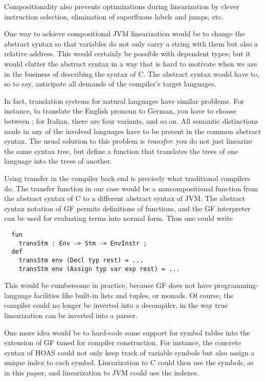 \documentclass[12pt]{article}
\newcommand{\empha}[1]{{\em #1}}
\begin{document}
Compositionality also prevents optimizations during linearization
by clever instruction selection, elimination of superfluous
labels and jumps, etc.

One way to achieve compositional JVM linearization would be
to change the abstract syntax
so that variables do not only carry a string with them but
also a relative address. This would certainly be possible
with dependent types; but it would clutter the abstract
syntax in a way that is hard to motivate when we are in
the business of describing the syntax of C. The abstract syntax would
have to, so to say, anticipate all demands of the compiler's
target languages. 

In fact, translation systems for natural
languages have similar problems. For instance, to translate
the English pronoun  to German, you have to choose
between ; for Italian, there are four
variants, and so on. All semantic distinctions
made in any of the involved languages have to be present
in the common abstract syntax. The usual solution to 
this problem is \empha{transfer}: you do not just linearize
the same syntax tree, but define a function that translates
the trees of one language into the trees of another.

Using transfer in the compiler
back end is precisely what traditional compilers do.
The transfer function in our case would be a noncompositional
function from the abstract syntax of C to a different abstract
syntax of JVM. The abstract syntax notation of GF permits
definitions of functions, and the GF interpreter can be used
for evaluating terms into normal form. Thus one could write
\begin{verbatim}
  fun 
    transStm : Env -> Stm -> EnvInstr ;
  def
    transStm env (Decl typ rest) = ... 
    transStm env (Assign typ var exp rest) = ... 
\end{verbatim}
This would be cumbersome in practice, because
GF does not have programming-language facilities 
like built-in lists and tuples, or monads. Of course, 
the compiler could no longer be inverted into a decompiler, 
in the way true linearization can be inverted into a parser.

One more idea would be to hard-code some support
for symbol tables into the extension of GF tuned for
compiler construction. For instance, the concrete syntax of HOAS
could not only keep track of variable symbols but also
assign a unique index to each symbol.
Linearization to C could then use the symbols, as
in this paper, and linearization to JVM could use 
the indexes.
\end{document}
